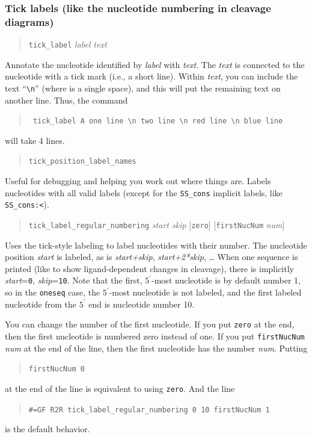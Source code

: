 \documentclass[letterpaper,12pt]{report}
\newcommand{\example}[1]{
\begin{quote}
{\raggedright
#1
}
\end{quote}
}
\newcommand{\examplett}[1]{
\example{{\tt #1}}
}
\begin{document}
\subsubsection{Tick labels (like the nucleotide numbering in cleavage
diagrams)}
\label{sec:ticklabel}
\example{{\tt tick\_label} \textit{label text}}

Annotate the nucleotide identified by \textit{label} with \textit{text}.  The
\textit{text} is connected to the nucleotide with a tick mark (i.e., a short line).
Within {\it text}, you can include the text ``{\tt \textvisiblespace{}\textbackslash{}n\textvisiblespace{}}'' (where {\tt \textvisiblespace{}} is a single space), and this will put the remaining text on another line.
Thus, the command
\examplett{
tick\_label A one line \textbackslash{}n two line \textbackslash{}n red line \textbackslash{}n blue line
}
will take 4 lines.

\example{{\tt tick\_position\_label\_names}}

Useful for debugging and helping you work out where things are.  Labels
nucleotides with all valid labels (except for the {\tt SS\_cons} implicit
labels, like {\tt SS\_cons:{\textless}}).

\example{{\tt tick\_label\_regular\_numbering} \textit{start skip} [{\tt zero}] [{\tt firstNucNum} {\it num}]}

Uses the tick-style labeling to label nucleotides with their number. 
The nucleotide position \textit{start} is labeled, as is
\textit{start+skip}, \textit{start+2*skip}, {\dots}  When one sequence
is printed (like to show ligand-dependent changes in cleavage), there
is implicitly \textit{start}={\tt 0}, \textit{skip}={\tt 10}.  Note that the first,
$5^\prime$-most nucleotide is by default number 1, so in the {\tt oneseq} case, the
$5^\prime$-most nucleotide is not labeled, and the first labeled
nucleotide from the $5^\prime$ end is nucleotide number 10.  

You can change the number of the first nucleotide.  If you put {\tt zero} at the end, then the first nucleotide is numbered zero instead of one.  If you put {\tt firstNucNum} {\it num} at the end of the line, then the first nucleotide has the number {\it num}.  Putting \begin{quote}{\tt firstNucNum 0}\end{quote} at the end of the line is equivalent to using {\tt zero}.  And the line
\begin{quote}{\tt \#=GF R2R tick\_label\_regular\_numbering 0 10 firstNucNum 1}\end{quote}
is the default behavior.
\end{document}
